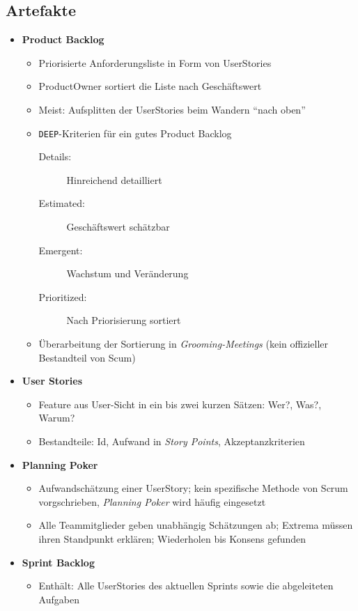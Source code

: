 \subsection{Artefakte}
\begin{itemize}
	\item \textbf{Product Backlog}
	\begin{itemize}
		\item Priorisierte Anforderungsliste in Form von UserStories
		\item ProductOwner sortiert die Liste nach Geschäftswert
		\item Meist: Aufsplitten der UserStories beim Wandern "`nach oben"'
		\item \texttt{DEEP}-Kriterien für ein gutes Product Backlog
		\begin{description}
			\item[Details:] Hinreichend detailliert
			\item[Estimated:] Geschäftswert schätzbar
			\item[Emergent:] Wachstum und Veränderung
			\item[Prioritized:] Nach Priorisierung sortiert
		\end{description}
		\item Überarbeitung der Sortierung in \textit{Grooming-Meetings} (kein offizieller Bestandteil von Scum)
	\end{itemize}
	\item \textbf{User Stories}
	\begin{itemize}
		\item Feature aus User-Sicht in ein bis zwei kurzen Sätzen: Wer?, Was?, Warum?
		\item Bestandteile: Id, Aufwand in \textit{Story Points}, Akzeptanzkriterien
	\end{itemize}
	\item \textbf{Planning Poker}
	\begin{itemize}
		\item Aufwandschätzung einer UserStory; kein spezifische Methode von Scrum vorgschrieben, \textit{Planning Poker} wird häufig eingesetzt
		\item Alle Teammitglieder geben unabhängig Schätzungen ab; Extrema müssen ihren Standpunkt erklären; Wiederholen bis Konsens gefunden
	\end{itemize}
	\item \textbf{Sprint Backlog}
	\begin{itemize}
		\item Enthält: Alle UserStories des aktuellen Sprints sowie die abgeleiteten Aufgaben

\end{itemize}
\end{itemize}
